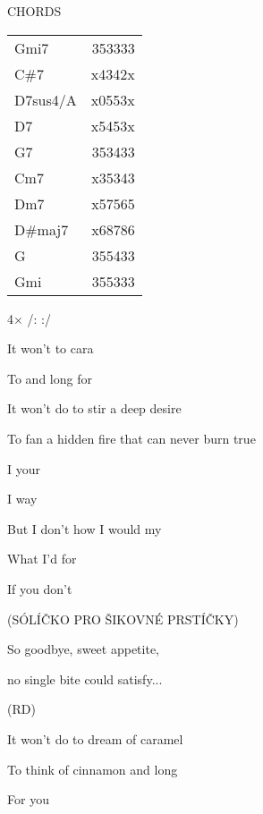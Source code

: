 

\ifdefined\TPBAND
CHORDS

\begin{tabular}{ l r }
  Gmi7     &  353333\\
  C\#7     &  x4342x\\
  D7sus4/A &  x0553x\\
  D7       &  x5453x\\
  G7       &  353433\\
  Cm7      &  x35343\\
  Dm7      &  x57565\\
  D\#maj7  &  x68786\\
  G        &  355433\\
  Gmi      &  355333\\
\end{tabular}
\fi

4× /:    :/

\zs
It won't   to  cara

To   and long for     
\ks

\zs
It won't do  to stir a deep desire

To fan a hidden fire that can never burn true
\ks

\zr
{}I  your   

I  way  

But I don't   how I would  my

What I'd for 

If you don't  
\kr

\ifdefined\TPBAND
\zs (SÓLÍČKO PRO ŠIKOVNÉ PRSTÍČKY)\ks
\fi

\zs
So goodbye, sweet appetite,

no single bite could satisfy...
\ks

\zr\kr

\ifdefined\TPBAND
(RD)
\else
{}  
\fi

\zs
It won't do to dream of caramel

To think of cinnamon and long

For you
\ks
\kp
